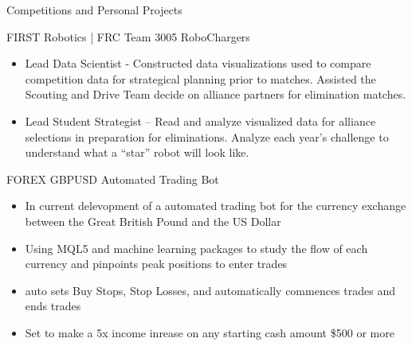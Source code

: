 \documentclass{article}
\newlength{\tabin}
\newlength{\secsep}
\newcommand{\lineunder}{\vspace*{-8pt} \\ \hspace*{-6pt} \hrulefill \\ \vspace*{-15pt}}
\newenvironment{tabbedsection}[1]{
  \begin{list}{}{
      \setlength{\itemsep}{0pt}
      \setlength{\labelsep}{0pt}
      \setlength{\labelwidth}{0pt}
      \setlength{\leftmargin}{\tabin}
      \setlength{\rightmargin}{\tabin}
      \setlength{\listparindent}{0pt}
      \setlength{\parsep}{0pt}
      \setlength{\parskip}{0pt}
      \setlength{\partopsep}{0pt}
      \setlength{\topsep}{#1}
    }
  \item[]
}{\end{list}}
\newenvironment{resume_section}[1]{
  \filbreak
  \vspace{2\secsep}
  \textsc{\large#1}
  \lineunder
  \begin{tabbedsection}{\secsep}
}{\end{tabbedsection}}
\newenvironment{resume_subsection}[2][]{
  \textbf{#2} \hfill {\footnotesize #1} \hspace{2em}
  \begin{tabbedsection}{0.5\secsep}
}{\end{tabbedsection}}
\newenvironment{subitems}{
  \renewcommand{\labelitemi}{-}
  \begin{itemize}
      \setlength{\labelsep}{1em}
}{\end{itemize}}
\begin{document}
\begin{resume_section}{Competitions and Personal Projects}
  \begin{resume_subsection}{FIRST Robotics | FRC Team 3005 RoboChargers}
  \begin{subitems}
    \item Lead Data Scientist - Constructed data visualizations used to compare competition data for strategical planning prior to matches. Assisted the Scouting and Drive Team decide on alliance partners for elimination matches. 
    \item Lead Student Strategist – Read and analyze visualized data for alliance selections in preparation for eliminations. Analyze each year’s challenge to understand what a “star” robot will look like. 
    \end{subitems}
  \end{resume_subsection}



  \begin{resume_subsection}[(Present)]{FOREX GBPUSD Automated Trading Bot}
  \begin{subitems}
    \item In current delevopment of a automated trading bot for the currency exchange between the Great British Pound and the US Dollar
    \item Using MQL5 and machine learning packages to study the flow of each currency and pinpoints peak positions to enter trades
    \item auto sets Buy Stops, Stop Losses, and automatically commences trades and ends trades
    \item Set to make a 5x income inrease on any starting cash amount \$500 or more
    \end{subitems}
  \end{resume_subsection}


\end{resume_section}
\end{document}

